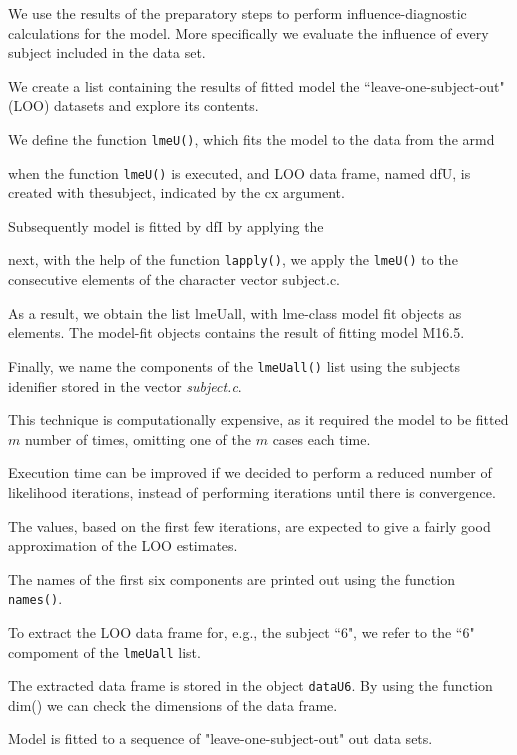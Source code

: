 \documentclass[a4paper,12pt]{article}
\begin{document}
We use the results of the preparatory steps to perform influence-diagnostic calculations for the model.
More specifically we evaluate the influence of every subject included in the data set.


We create a list containing the results of fitted model the ``leave-one-subject-out" (LOO)
datasets and explore its contents.

We define the function \texttt{lmeU()}, which fits the model to the data from the armd

when the function \texttt{lmeU()} is executed, and LOO data frame, named dfU, is created with thesubject, indicated by the cx argument.

Subsequently model is fitted by dfI by applying the 


next, with the help of the function \texttt{lapply()}, we apply the \texttt{lmeU()} to the consecutive elements of the character vector subject.c.

As a result, we obtain the list lmeUall, with lme-class model fit objects as elements. The model-fit objects contains the result of fitting model
M16.5.

Finally, we name the components of the \texttt{lmeUall()} list using the subjects idenifier stored in the vector \textit{subject.c}.

This technique is computationally expensive, as it required the model to be fitted $m$ number of times, omitting one of the $m$ cases each time.

Execution time can be improved if we decided to perform a reduced number of likelihood iterations, instead of performing iterations until there is convergence.

The values, based on the first few iterations, are expected to give a fairly good approximation of the LOO estimates.


The names of the first six components are printed out using the function \texttt{names()}.

To extract the LOO data frame for, e.g., the subject ``6", we refer to the ``6" compoment of the
\texttt{lmeUall} list.

The extracted data frame is stored in the object \texttt{dataU6}. By using the function dim() we can check the dimensions of the data frame.



Model is fitted to a sequence of "leave-one-subject-out" out data sets.
\end{document}
